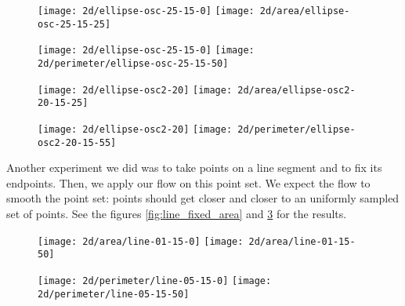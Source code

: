 \begin{figure}[h]
    \centering

    \texttt{[image: 2d/ellipse-osc-25-15-0]}
    \texttt{[image: 2d/area/ellipse-osc-25-15-25]}
    \label{fig:ellipse_osc_area_flow}

    \texttt{[image: 2d/ellipse-osc-25-15-0]}
    \texttt{[image: 2d/perimeter/ellipse-osc-25-15-50]}
    \label{fig:ellipse_osc_perimeter_flow}
\end{figure}

\begin{figure}[h]
    \centering

    \texttt{[image: 2d/ellipse-osc2-20]}
    \texttt{[image: 2d/area/ellipse-osc2-20-15-25]}
    \label{fig:ellipse_osc2_area_flow}

    \texttt{[image: 2d/ellipse-osc2-20]}
    \texttt{[image: 2d/perimeter/ellipse-osc2-20-15-55]}
    \label{fig:ellipse_osc2_perimeter_flow}
\end{figure}


Another experiment we did was to take points on a line segment and to fix its
endpoints. Then, we apply our flow on this point set. We expect the flow to
smooth the point set: points should get closer and closer to an uniformly
sampled set of points. See the figures \ref{fig:line_fixed_area} and
\ref{fig:line_fixed_perimeter} for the results.

\begin{figure}[h]
    \centering

    \texttt{[image: 2d/area/line-01-15-0]}
    \texttt{[image: 2d/area/line-01-15-50]}
    \label{fig:line_fixed_area}

    \texttt{[image: 2d/perimeter/line-05-15-0]}
    \texttt{[image: 2d/perimeter/line-05-15-50]}
    \label{fig:line_fixed_perimeter}
\end{figure}

